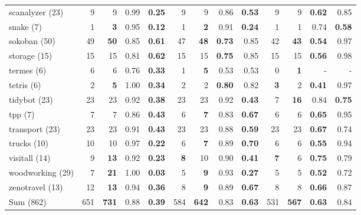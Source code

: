 \begin{tabular}{l||rr|rr||rr|rr||rr|rr}
	scanalyzer (23) & 9 & 9 & 0.99 & \textbf{0.25}  & 9 & 9 & 0.86 & \textbf{0.53}  & 9 & 9 & \textbf{0.62}  & 0.85\\
	snake (7) & 1 & \textbf{3}  & 0.95 & \textbf{0.12}  & 1 & \textbf{2}  & 0.91 & \textbf{0.24}  & 1 & 1 & 0.74 & \textbf{0.58} \\
	sokoban (50) & 49 & \textbf{50}  & 0.85 & \textbf{0.61}  & 47 & \textbf{48}  & \textbf{0.73}  & 0.85 & 42 & \textbf{43}  & \textbf{0.54}  & 0.97\\
	storage (15) & 15 & 15 & 0.81 & \textbf{0.62}  & 15 & 15 & \textbf{0.75}  & 0.85 & 15 & 15 & \textbf{0.56}  & 0.98\\
	termes (6) & 6 & 6 & 0.76 & \textbf{0.33}  & 1 & \textbf{5}  & 0.53 & 0.53 & 0 & \textbf{1}  & - & -\\
	tetris (6) & 2 & \textbf{5}  & 1.00 & \textbf{0.34}  & 2 & 2 & \textbf{0.80}  & 0.82 & \textbf{3}  & 2 & \textbf{0.41}  & 0.97\\
	tidybot (23) & 23 & 23 & 0.92 & \textbf{0.38}  & 23 & 23 & 0.92 & \textbf{0.43}  & 7 & \textbf{16} & 0.84 & \textbf{0.75} \\
	tpp (7) & 7 & 7 & 0.86 & \textbf{0.43}  & 6 & \textbf{7}  & 0.83 & \textbf{0.67}  & 6 & 6 & \textbf{0.65}  & 0.95\\
	transport (23) & 23 & 23 & 0.91 & \textbf{0.43}  & 23 & 23 & 0.88 & \textbf{0.59}  & 23 & 23 & \textbf{0.67}  & 0.74\\
	trucks (10) & 10 & 10 & 0.97 & \textbf{0.22}  & 6 & \textbf{7}  & 0.89 & \textbf{0.70}  & 6 & 6 & \textbf{0.55}  & 0.94\\
	visitall (14) & 9  & \textbf{13} & 0.92 & \textbf{0.23}  & \textbf{8}  & 10 & 0.90 & \textbf{0.41}  & \textbf{7}  & 6 & \textbf{0.75}  & 0.79\\
	woodworking (29) & 7  & \textbf{21} & 1.00 & \textbf{0.03}  & 5 & \textbf{9}  & 0.93 & \textbf{0.27}  & 5 & 5 & \textbf{0.52}  & 0.72\\
	zenotravel (13) & 12 & \textbf{13}  & 0.94 & \textbf{0.36}  & 8 & \textbf{9}  & 0.89 & \textbf{0.67}  & 8 & 8 & \textbf{0.66}  & 0.87\\\hline
	Sum (862) & 651 & \textbf{731}  & 0.88 & \textbf{0.39}  & 584 & \textbf{642}  & 0.83 & \textbf{0.63}  & 531 & \textbf{567}  & \textbf{0.63}  & 0.84\\
	\end{tabular}

